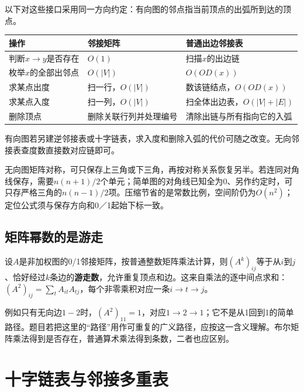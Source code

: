 以下对这些接口采用同一方向约定：有向图的邻点指当前顶点的出弧所到达的顶点。

\par\medskip\noindent\begin{minipage}{\linewidth}\fontsize{9.3}{12}\selectfont\begin{tabularx}{\linewidth}{@{}YYY@{}}
\toprule\noalign{}
操作 & 邻接矩阵 & 普通出边邻接表 \\
\midrule\noalign{}


判断\(x\to y\)是否存在 & \(O(1)\) & 扫描\(x\)的出边链 \\
枚举\(x\)的全部出邻点 & \(O(|V|)\) & \(O(OD(x))\) \\
求某点出度 & 扫一行，\(O(|V|)\) & 数该链结点，\(O(OD(x))\) \\
求某点入度 & 扫一列，\(O(|V|)\) & 扫全体出边表，\(O(|V|+|E|)\) \\
删除顶点 & 删除关联行列并处理编号 & 清除出链与所有指向它的入弧 \\
\bottomrule\end{tabularx}
\end{minipage}\par\medskip

有向图若另建逆邻接表或十字链表，求入度和删除入弧的代价可随之改变。无向邻接表查度数直接数对应链即可。

无向图矩阵对称，可只保存上三角或下三角，再按对称关系恢复另半。若连同对角线保存，需要\(n(n+1)/2\)个单元；简单图的对角线已知全为0、另作约定时，可只存严格三角的\(n(n-1)/2\)项。压缩节省的是常数比例，空间阶仍为\(O(n^2)\)；定位公式须与保存方向和0／1起始下标一致。

\subsection{矩阵幂数的是游走}\label{DS06-matrix-power}

设\(A\)是非加权图的0/1邻接矩阵，按普通整数矩阵乘法计算，则\((A^k)_{ij}\)等于从\(i\)到\(j\)、恰好经过\(k\)条边的\textbf{游走数}，允许重复顶点和边。这来自乘法的逐中间点求和：\((A^2)_{ij}=\sum_t A_{it}A_{tj}\)，每个非零乘积对应一条\(i\to t\to j\)。

例如只有无向边\(1-2\)时，\((A^2)_{11}=1\)，对应\(1\to2\to1\)；它不是从1回到1的简单路径。题目若把这里的``路径''用作可重复的广义路径，应按这一含义理解。布尔矩阵乘法得到是否存在，普通算术乘法得到条数，二者也应区别。

\section{十字链表与邻接多重表}\label{DS06-03}

